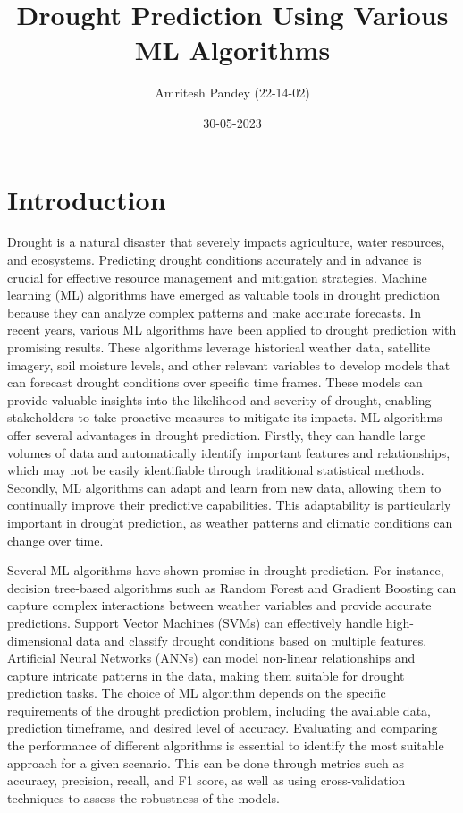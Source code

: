 \documentclass{article}
\begin{document}
\title{Drought Prediction Using Various ML Algorithms}
\author{Amritesh Pandey (22-14-02)}
\date{30-05-2023}
\maketitle

\section{Introduction}

Drought is a natural disaster that severely impacts agriculture, water resources, and ecosystems. Predicting drought conditions accurately and in advance is crucial for effective resource management and mitigation strategies. Machine learning (ML) algorithms have emerged as valuable tools in drought prediction because they can analyze complex patterns and make accurate forecasts. In recent years, various ML algorithms have been applied to drought prediction with promising results. These algorithms leverage historical weather data, satellite imagery, soil moisture levels, and other relevant variables to develop models that can forecast drought conditions over specific time frames. These models can provide valuable insights into the likelihood and severity of drought, enabling stakeholders to take proactive measures to mitigate its impacts. ML algorithms offer several advantages in drought prediction. Firstly, they can handle large volumes of data and automatically identify important features and relationships, which may not be easily identifiable through traditional statistical methods. Secondly, ML algorithms can adapt and learn from new data, allowing them to continually improve their predictive capabilities. This adaptability is particularly important in drought prediction, as weather patterns and climatic conditions can change over time.

Several ML algorithms have shown promise in drought prediction. For instance, decision tree-based algorithms such as Random Forest and Gradient Boosting can capture complex interactions between weather variables and provide accurate predictions. Support Vector Machines (SVMs) can effectively handle high-dimensional data and classify drought conditions based on multiple features. Artificial Neural Networks (ANNs) can model non-linear relationships and capture intricate patterns in the data, making them suitable for drought prediction tasks. The choice of ML algorithm depends on the specific requirements of the drought prediction problem, including the available data, prediction timeframe, and desired level of accuracy. Evaluating and comparing the performance of different algorithms is essential to identify the most suitable approach for a given scenario. This can be done through metrics such as accuracy, precision, recall, and F1 score, as well as using cross-validation techniques to assess the robustness of the models.
\end{document}
